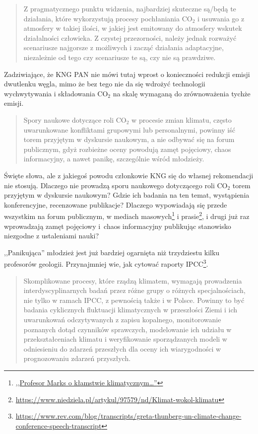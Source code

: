 \documentclass[12pt]{article}
\begin{document}
\begin{quotation}
	Z pragmatycznego punktu widzenia, najbardziej skuteczne są/będą te działania, które wykorzystują procesy pochłaniania CO$_2$ i usuwania go z atmosfery w takiej ilości, w jakiej jest emitowany do atmosfery wskutek działalności człowieka. Z czystej przezorności, należy jednak rozważyć scenariusze najgorsze z możliwych i zacząć działania adaptacyjne, niezależnie od tego czy scenariusze te są, czy nie są prawdziwe.
\end{quotation}			

Zadziwiające, że KNG PAN nie mówi tutaj wprost o konieczności redukcji emisji dwutlenku węgla, mimo że bez tego nie da się wdrożyć technologii wychwytywania i składowania CO$_2$ na skalę wymaganą do zrównoważenia tychże emisji.
			
\begin{quotation}
	Spory naukowe dotyczące roli CO$_2$ w procesie zmian klimatu, często uwarunkowane konfliktami grupowymi lub personalnymi, powinny iść torem przyjętym w dyskursie naukowym, a nie odbywać się na forum publicznym, gdyż rozbieżne oceny powodują zamęt pojęciowy, chaos informacyjny, a nawet panikę, szczególnie wśród młodzieży.
\end{quotation}
			
Święte słowa, ale z jakiegoś powodu członkowie KNG się do własnej rekomendacji nie stosują. Dlaczego nie prowadzą sporu naukowego dotyczącego roli CO$_2$ torem przyjętym w dyskursie naukowym? Gdzie ich badania na ten temat, wystąpienia konferencyjne, recenzowane publikacje? Dlaczego wypowiadają się przede wszystkim na forum publicznym, w mediach masowych\footnote{\href{https://wnet.fm/2019/12/11/profesor-marks-o-klamstwie-klimatycznym-wymieraniu-gatunkow-braku-wody-zmianach-w-przyrodzie-i-produkcji-co2/}{,,Profesor Marks o kłamstwie klimatycznym\ldots''}} i prasie\footnote{\url{https://www.niedziela.pl/artykul/97579/nd/Klimat-wokol-klimatu}}, i drugi już raz wprowadzają zamęt pojęciowy i~chaos informacyjny publikując stanowisko niezgodne z ustaleniami nauki?
			
,,Panikująca'' młodzież jest już bardziej ogarnięta niż trzydziestu kilku profesorów geologii. Przynajmniej wie, jak cytować raporty IPCC\footnote{\url{https://www.rev.com/blog/transcripts/greta-thunberg-un-climate-change-conference-speech-transcript}}.
			
\begin{quotation}
	Skomplikowane procesy, które rządzą klimatem, wymagają prowadzenia interdyscyplinarnych badań przez różne grupy o różnych specjalnościach, nie tylko w ramach IPCC, z pewnością także i w Polsce. Powinny to być badania cyklicznych fluktuacji klimatycznych w przeszłości Ziemi i ich uwarunkowań odczytywanych z zapisu kopalnego, monitorowanie poznanych dotąd czynników sprawczych, modelowanie ich udziału w przekształceniach klimatu i weryfikowanie sporządzanych modeli w odniesieniu do zdarzeń przeszłych dla oceny ich wiarygodności w prognozowaniu zdarzeń przyszłych.
\end{quotation}			
\end{document}

